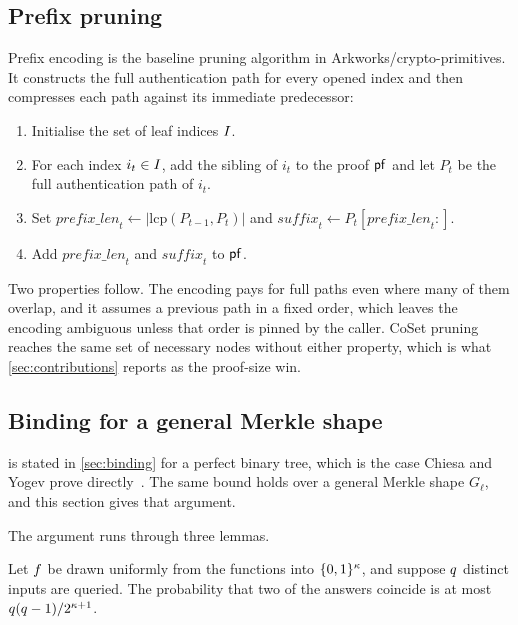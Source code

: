 \subsection{Prefix pruning}
\label{app:prefix}

Prefix encoding is the baseline pruning algorithm in \textsf{Arkworks/crypto-primitives}.  It
constructs the full authentication path for every opened index and then compresses each
path against its immediate predecessor:

\begin{enumerate}[itemsep=0pt,topsep=2pt]
  \item Initialise the set of leaf indices $I$.
  \item For each index $i_t\in I$, add the sibling of $i_t$ to the proof $\mathsf{pf}$
  and let $P_t$ be the full authentication path of $i_t$.
  \item Set $\mathit{prefix\_len}_t\leftarrow|\mathrm{lcp}(P_{t-1},P_t)|$ and
  $\mathit{suffix}_t\leftarrow P_t[\mathit{prefix\_len}_t{:}]$.
  \item Add $\mathit{prefix\_len}_t$ and $\mathit{suffix}_t$ to $\mathsf{pf}$.
\end{enumerate}

Two properties follow.  The encoding pays for full paths even where many of them overlap,
and it assumes a previous path in a fixed order, which leaves the encoding ambiguous
unless that order is pinned by the caller.  CoSet pruning reaches the same set of
necessary nodes without either property, which is what \cref{sec:contributions} reports as
the proof-size win.

\subsection{Binding for a general Merkle shape}
\label{app:binding-generic}

 is stated in \cref{sec:binding} for a perfect binary tree, which is
the case Chiesa and Yogev prove directly~\cite{CY26}.  The same bound holds over a general
Merkle shape $G_\ell$, and this section gives that argument.

The argument runs through three lemmas.

\begin{lemma}\label{lem:birthday}
Let $f$ be drawn uniformly from the functions into $\{0,1\}^{\kappa}$, and
suppose $q$ distinct inputs are queried.  The probability that two of the
answers coincide is at most $q(q-1)/2^{\kappa+1}$.
\end{lemma}

